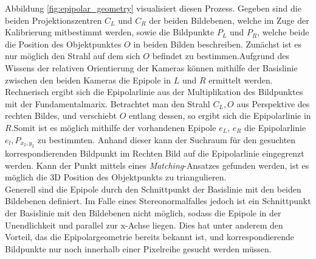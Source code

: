\noindent
Abbildung \ref{fig:epipolar_geometry} visualisiert diesen Prozess. Gegeben sind die beiden Projektionszentren $C_L$ und $C_R$ der beiden Bildebenen, welche im Zuge der Kalibrierung mitbestimmt werden, sowie die Bildpunkte $P_L$ und $P_R$, welche beide die Position des Objektpunktes $O$ in beiden Bilden beschreiben. Zunächst ist es nur möglich den Strahl auf dem sich $O$ befindet zu bestimmen.Aufgrund des Wissens der relativen Orientierung der Kameras können mithilfe der Basislinie zwischen den beiden Kameras die Epipole in $L$ und $R$ ermittelt werden. Rechnerisch ergibt sich die Epipolarlinie aus der Multiplikation des Bildpunktes mit der Fundamentalmarix. Betrachtet man den Strahl $C_L,O$ aus Perspektive des rechten Bildes, und verschiebt $O$ entlang dessen, so ergibt sich die Epipolarlinie in $R$.Somit ist es möglich mithilfe der vorhandenen Epipole $e_L$, $e_R$ die Epipolarlinie $e_l,P_{x_2,y_2}$ zu bestimmten. Anhand dieser kann der Suchraum für den gesuchten korrespondierenden Bildpunkt im Rechten Bild auf die Epipolarlinie eingegrenzt werden. Kann der Punkt mittels eines \emph{Matching}-Ansatzes gefunden werden, ist es möglich die 3D Position des Objektpunkts zu triangulieren.\\
\noindent
Generell sind die Epipole durch den Schnittpunkt der Basislinie mit den beiden Bildebenen definiert. Im Falle eines Stereonormalfalles jedoch ist ein Schnittpunkt der Basislinie mit den Bildebenen nicht möglich, sodass die Epipole in der Unendlichkeit und parallel zur x-Achse liegen. Dies hat unter anderem den Vorteil, das die Epipolargeometrie bereits bekannt ist, und korrespondierende Bildpunkte nur noch innerhalb einer Pixelreihe gesucht werden müssen.


